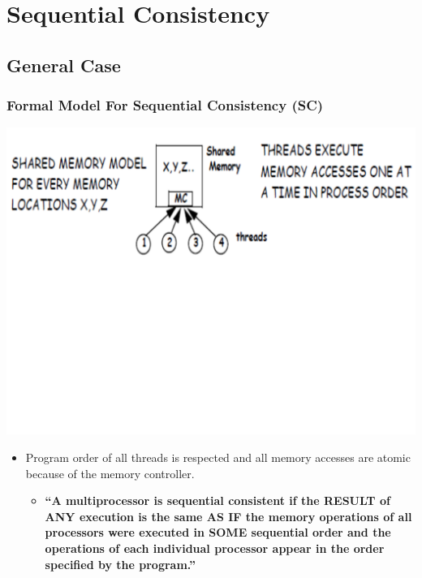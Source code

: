 \documentclass{beamer}
\newcommand{\emp}[1]{\textcolor{DikuRed}{ #1}}
\begin{document}
\section{Sequential Consistency}

\begin{frame}[fragile]
	\tableofcontents[currentsection]
\end{frame}

\subsection{General Case}

\begin{frame}[fragile,t]
\frametitle{Formal Model For Sequential Consistency (SC)}

{\center \includegraphics[width=59ex]{Ch7Figs/MemSeqCons}}\pause
\vspace{-20ex}

\begin{itemize}
    \item Program order of all threads is respected and all memory accesses are atomic
            because of the memory controller.
    \begin{itemize}
        \item \emp{\bf ``A multiprocessor is sequential consistent if the RESULT of ANY
                execution is the same AS IF the memory operations of all processors
                were executed in SOME sequential order and the operations of each
                individual processor appear in the order specified by the program.''}
    \end  {itemize}
\end{itemize}

\end{frame}
\end{document}

